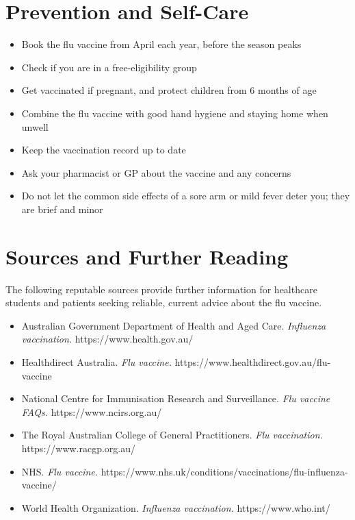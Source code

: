 \section*{Prevention and Self-Care}
\begin{itemize}
    \item Book the flu vaccine from April each year, before the season peaks
    \item Check if you are in a free-eligibility group
    \item Get vaccinated if pregnant, and protect children from 6 months of age
    \item Combine the flu vaccine with good hand hygiene and staying home when unwell
    \item Keep the vaccination record up to date
    \item Ask your pharmacist or GP about the vaccine and any concerns
    \item Do not let the common side effects of a sore arm or mild fever deter you; they are brief and minor
\end{itemize}

\section*{Sources and Further Reading}
The following reputable sources provide further information for healthcare students and patients seeking reliable, current advice about the flu vaccine.
\begin{itemize}
    \item Australian Government Department of Health and Aged Care. \textit{Influenza vaccination.} https://www.health.gov.au/
    \item Healthdirect Australia. \textit{Flu vaccine.} https://www.healthdirect.gov.au/flu-vaccine
    \item National Centre for Immunisation Research and Surveillance. \textit{Flu vaccine FAQs.} https://www.ncirs.org.au/
    \item The Royal Australian College of General Practitioners. \textit{Flu vaccination.} https://www.racgp.org.au/
    \item NHS. \textit{Flu vaccine.} https://www.nhs.uk/conditions/vaccinations/flu-influenza-vaccine/
    \item World Health Organization. \textit{Influenza vaccination.} https://www.who.int/
\end{itemize}
